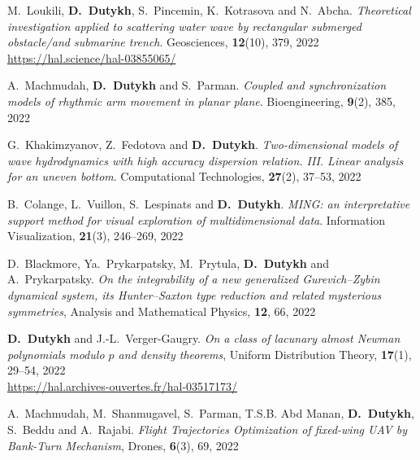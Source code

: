 \documentclass[final, a4paper, oneside, 12pt]{article}
\numberwithin{equation}{section}
\begin{document}
\begin{etaremune}
  \item M.~Loukili, \textbf{D.~Dutykh}, S.~Pincemin, K.~Kotrasova and N.~Abcha. \textit{Theoretical investigation applied to scattering water wave by rectangular submerged obstacle/and submarine trench}. Geosciences, \textbf{12}(10), 379, 2022 \\ %
  \url{https://hal.science/hal-03855065/}
  
  
  \item A.~Machmudah, \textbf{D.~Dutykh} and S.~Parman. \textit{Coupled and synchronization models of rhythmic arm movement in planar plane}. Bioengineering, \textbf{9}(2), 385, 2022 %
  
  \item G.~Khakimzyanov, Z.~Fedotova and \textbf{D.~Dutykh}. \textit{Two-dimensional models of wave hydrodynamics with high accuracy dispersion relation. III. Linear analysis for an uneven bottom}. Computational Technologies, \textbf{27}(2), 37--53, 2022 %
  
  \item B.~Colange, L.~Vuillon, S.~Lespinats and \textbf{D.~Dutykh}. \textit{MING: an interpretative support method for visual exploration of multidimensional data}. Information Visualization, \textbf{21}(3), 246--269, 2022 %
  
  \item D.~Blackmore, Ya.~Prykarpatsky, M.~Prytula, \textbf{D.~Dutykh} and A.~Prykarpatsky. \textit{On the integrability of a new generalized Gurevich--Zybin dynamical system, its Hunter--Saxton type reduction and related mysterious symmetries}, Analysis and Mathematical Physics, \textbf{12}, 66, 2022 %
  
  \item \textbf{D.~Dutykh} and J.-L.~Verger-Gaugry. \textit{On a class of lacunary almost Newman polynomials modulo $p$ and density theorems}, Uniform Distribution Theory, \textbf{17}(1), 29--54, 2022 \\ %
  \url{https://hal.archives-ouvertes.fr/hal-03517173/}
  
  \item A.~Machmudah, M.~Shanmugavel, S.~Parman, T.S.B. Abd Manan, \textbf{D.~Dutykh}, S.~Beddu and A.~Rajabi. \textit{Flight Trajectories Optimization of fixed-wing UAV by Bank-Turn Mechanism}, Drones, \textbf{6}(3), 69, 2022 %
  

\end{etaremune}
\end{document}
